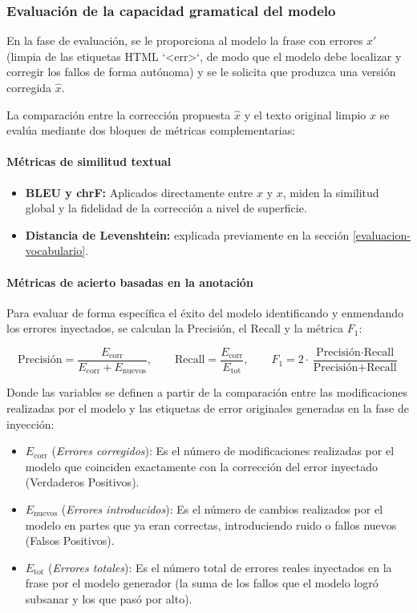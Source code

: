 \subsubsection{Evaluación de la capacidad gramatical del modelo}

En la fase de evaluación, se le proporciona al modelo la frase con errores $x'$ (limpia de las etiquetas HTML `<err>`, de modo que el modelo debe localizar y corregir los fallos de forma autónoma) y se le solicita que produzca una versión corregida $\hat{x}$. 

La comparación entre la corrección propuesta $\hat{x}$ y el texto original limpio $x$ se evalúa mediante dos bloques de métricas complementarias:

\paragraph{Métricas de similitud textual}

\begin{itemize}
    \item \textbf{BLEU y chrF:} Aplicados directamente entre $\hat{x}$ y $x$, miden la similitud global y la fidelidad de la corrección a nivel de superficie.
    \item \textbf{Distancia de Levenshtein:} explicada previamente en la sección \ref{evaluacion-vocabulario}.
\end{itemize}

\paragraph{Métricas de acierto basadas en la anotación}

Para evaluar de forma específica el éxito del modelo identificando y enmendando los errores inyectados, se calculan la Precisión, el Recall y la métrica $F_1$:

\label{precision-recall-gramatical}
\[
\text{Precisión} = \frac{E_{\text{corr}}}{E_{\text{corr}} + E_{\text{nuevos}}}, \qquad
\text{Recall} = \frac{E_{\text{corr}}}{E_{\text{tot}}}, \qquad
F_1 = 2 \cdot \frac{\text{Precisión} \cdot \text{Recall}}{\text{Precisión} + \text{Recall}}
\]

Donde las variables se definen a partir de la comparación entre las modificaciones realizadas por el modelo y las etiquetas de error originales generadas en la fase de inyección:
\begin{itemize}
    \item $E_{\text{corr}}$ (\textit{Errores corregidos}): Es el número de modificaciones realizadas por el modelo que coinciden exactamente con la corrección del error inyectado (Verdaderos Positivos).
    \item $E_{\text{nuevos}}$ (\textit{Errores introducidos}): Es el número de cambios realizados por el modelo en partes que ya eran correctas, introduciendo ruido o fallos nuevos (Falsos Positivos).
    \item $E_{\text{tot}}$ (\textit{Errores totales}): Es el número total de errores reales inyectados en la frase por el modelo generador (la suma de los fallos que el modelo logró subsanar y los que pasó por alto).
\end{itemize}

